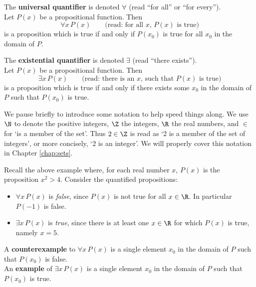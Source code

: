 \begin{defn}
The \textbf{universal quantifier} is denoted $\forall$ (read ``for all'' or ``for every''). \\

\noindent Let $P(x)$ be a propositional function. Then \[\forall x \, P(x) \qquad \text{(read: for all $x$, $P(x)$ is true})\] is a proposition which is true if and only if $P(x_0)$ is true for all $x_0$ in the domain of $P$.
\end{defn}

\begin{defn}
The \textbf{existential quantifier} is denoted $\exists$ (read ``there exists''). \\

\noindent Let $P(x)$ be a propositional function. Then \[\exists x \, P(x)  \qquad \text{(read: there is an $x$, such that $P(x)$ is true})\] is a proposition which is true if and only if there exists some $x_0$ in the domain of $P$ such that $P(x_0)$ is true.
\end{defn}

We pause briefly to introduce some notation to help speed things along. We use $\N$ to denote the positive integers, $\Z$ the integers, $\R$ the real numbers, and $\in$ for `is a member of the set'. Thus $2\in\Z$ is read as `2 is a member of the set of integers', or more concisely, `2 is an integer'. We will properly cover this notation in Chapter \ref{chap:sets}.

\begin{example}
Recall the above example where, for each real number $x$, $P(x)$ is the proposition $x^2>4$. Consider the quantified propositions:
\begin{itemize}
  \item $\forall x \, P(x)$ is \emph{false}, since $P(x)$ is not true for all $x\in\R$. In particular $P(-1)$ is false.
  \item $\exists x \, P(x)$ is \emph{true}, since there is at least one $x\in\R$ for which $P(x)$ is true, namely $x=5$.
\end{itemize}
\end{example}

\begin{defn}
A \textbf{counterexample} to $\forall x \, P(x)$ is a single element $x_0$ in the domain of $P$ such that $P(x_0)$ is false.\\
An \textbf{example} of $\exists x \, P(x)$ is a single element $x_0$ in the domain of $P$ such that $P(x_0)$ is true.
\end{defn}


